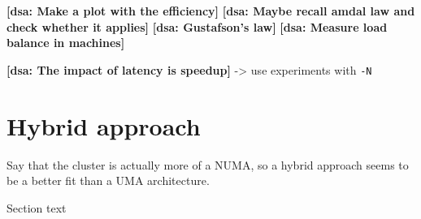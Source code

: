\documentclass{article}
\newcommand{\dsanote}[1]{\textbf{[dsa: #1]}}
\begin{document}
\dsanote{Make a plot with the efficiency}
\dsanote{Maybe recall amdal law and check whether it applies}
\dsanote{Gustafson's law}
\dsanote{Measure load balance in machines}

\dsanote{The impact of latency is speedup} -> use experiments with \texttt{-N}



\section{Hybrid approach}

Say that the cluster is actually more of a NUMA, so a hybrid approach seems
to be a better fit than a UMA architecture.

Section text


\newpage



% 

\end{document}

